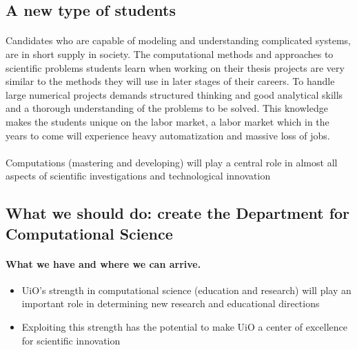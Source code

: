 \documentclass[%
oneside,                 %
final,                   %
10pt]{article}
\begin{document}
\subsection*{A new type of students}

\paragraph{}
Candidates who are capable of modeling and understanding complicated
systems, are in short supply in society.  The
computational methods and approaches to scientific problems students learn
when working on their thesis projects are very similar to the methods
they will use in later stages of their careers.  To handle large
numerical projects demands structured thinking and good analytical
skills and a thorough understanding of the problems to be solved. This
knowledge makes the students unique on the labor market, a labor market which in the years to come will experience heavy automatization and massive loss of jobs.




\paragraph{}
Computations (mastering and developing)  will play a central role in almost all aspects of scientific investigations and technological innovation





\subsection*{What we should do: create the Department  for Computational Science}

\paragraph{What we have and where we can arrive.}
\begin{itemize}
\item UiO's strength in computational science (education and research) will play an important role in  determining new research and educational directions

\item Exploiting this strength has the potential to make UiO a center of excellence for scientific innovation
\end{itemize}
\end{document}
